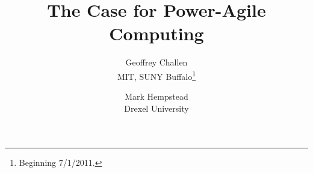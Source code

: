 

\date{}

\title{\Large \bf The Case for Power-Agile Computing}

\author{
{\rm Geoffrey Challen}\\
MIT, SUNY Buffalo\thanks{Beginning 7/1/2011.}
\and
{\rm Mark Hempstead}\\
Drexel University
}

\maketitle






{\footnotesize


}



